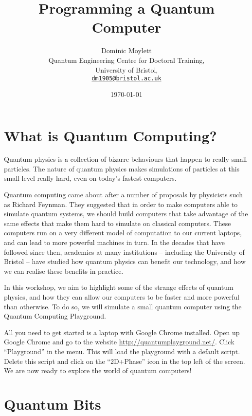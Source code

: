 \documentclass[twocolumn]{article}
\begin{document}
\lstset{style=Style1}

\title{Programming a Quantum Computer}
\author{Dominic Moylett\\
        	Quantum Engineering Centre for Doctoral Training,\\
		University of Bristol,\\
		\texttt{\href{mailto:dm1905@bristol.ac.uk}{dm1905@bristol.ac.uk}}
		}
\date{\today}
\maketitle

\section{What is Quantum Computing?}

Quantum physics is a collection of bizarre behaviours that happen to really small particles. The nature of quantum physics makes simulations of particles at this small level really hard, even on today's fastest computers.

Quantum computing came about after a number of proposals by physicists such as Richard Feynman. They suggested that in order to make computers able to simulate quantum systems, we should build computers that take advantage of the same effects that make them hard to simulate on classical computers. These computers run on a very different model of computation to our current laptops, and can lead to more powerful machines in turn. In the decades that have followed since then, academics at many institutions -- including the University of Bristol -- have studied how quantum physics can benefit our technology, and how we can realise these benefits in practice.

In this workshop, we aim to highlight some of the strange effects of quantum physics, and how they can allow our computers to be faster and more powerful than otherwise. To do so, we will simulate a small quantum computer using the Quantum Computing Playground.

All you need to get started is a laptop with Google Chrome installed. Open up Google Chrome and go to the website \url{http://quantumplayground.net/}. Click ``Playground'' in the menu. This will load the playground with a default script. Delete this script and click on the ``2D+Phase'' icon in the top left of the screen. We are now ready to explore the world of quantum computers!

\section{Quantum Bits}
\end{document}

